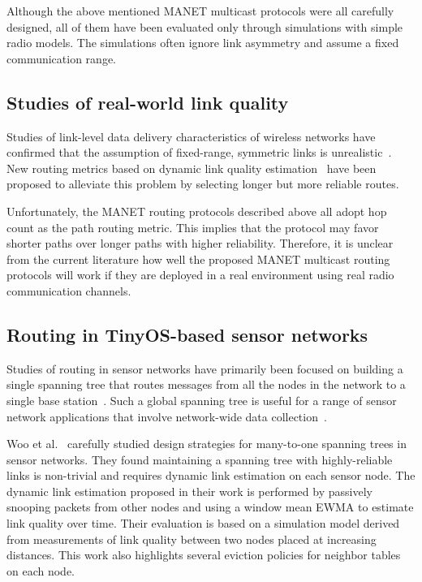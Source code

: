 Although the above mentioned MANET multicast protocols 
were all carefully designed, all of them have been evaluated 
only through simulations with simple radio models.
The simulations often ignore link asymmetry and assume a fixed 
communication range.


\subsection{Studies of real-world link quality }

Studies of link-level data delivery characteristics of wireless 
networks have confirmed that the assumption of fixed-range, symmetric
links is unrealistic~\cite{connectivity-sigcomm04,
scale, ganesan-empirical}. New routing metrics based on 
dynamic link quality estimation~\cite{etx,awoo-multihop} have been
proposed to alleviate this problem by selecting longer but more 
reliable routes.

Unfortunately, the MANET routing protocols described above all adopt hop 
count as the path routing metric.  
This implies that the protocol may favor shorter paths
over longer paths with higher reliability. 
Therefore, it is unclear from the current literature 
how well the proposed MANET multicast routing protocols will work 
if they are deployed in a real environment using real radio 
communication channels.

\subsection{Routing in TinyOS-based sensor networks}

Studies of routing in sensor networks have primarily been focused on 
building a single spanning tree that routes messages from all the 
nodes in the network to a single base 
station~\cite{awoo-multihop,dimensions,tinydb-osdi,nath-synopsis-diffusion,diffusion}.
Such a global spanning tree is useful for a range of sensor
network applications that involve network-wide data 
collection~\cite{gdi, habitat-cacm, countersniper-sensys04}.  

Woo et al.~\cite{awoo-multihop} carefully studied design
strategies for many-to-one spanning trees in sensor networks.
They found maintaining a spanning tree with highly-reliable links
is non-trivial and requires dynamic link estimation on each sensor node.
The dynamic link estimation proposed in their work is performed by
passively snooping packets from other nodes and using a window mean
EWMA to estimate link quality over time. 
Their evaluation is based on a simulation model derived from 
measurements of link quality between two nodes placed at increasing 
distances. This work also highlights several eviction policies for 
neighbor tables on each node.

